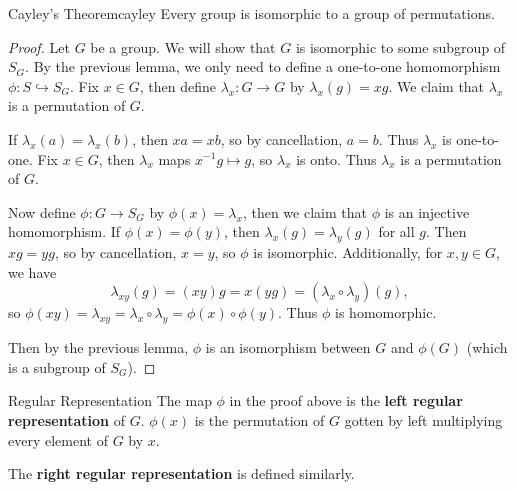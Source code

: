 \documentclass[10pt]{report}
\begin{document}
\begin{thrm}{Cayley's Theorem}{cayley}
Every group is isomorphic to a group of permutations.
\end{thrm}
\begin{proof}
	Let $G$ be a group. We will show that $G$ is isomorphic to some subgroup of $S_{G}$. By the previous lemma, we only need to define a one-to-one homomorphism $\phi:S\hookrightarrow S_G$. Fix $x \in G$, then define $\lambda_x:G\to G$ by $\lambda_x(g) =xg$. We claim that $\lambda_x$ is a permutation of $G$.

	If $\lambda_x(a)=\lambda_x(b)$, then $xa=xb$, so by cancellation, $a=b$. Thus $\lambda_x$ is one-to-one. Fix $x \in G$, then $\lambda_x$ maps $x^{-1}g \mapsto g$, so $\lambda_x$ is onto. Thus $\lambda_x$ is a permutation of $G$.

	Now define $\phi:G\to S_G$ by $\phi(x)=\lambda_x$, then we claim that $\phi$ is an injective homomorphism. If $\phi(x)=\phi(y)$, then $\lambda_x(g)=\lambda_y(g)$ for all $g$. Then $xg=yg$, so by cancellation, $x=y$, so $\phi$ is isomorphic. Additionally, for $x,y\in G$, we have
	\[
		\lambda_{xy}(g)=(xy)g=x(yg)=(\lambda_x \circ \lambda_y)(g),
	\] so $\phi(xy)=\lambda_{xy}=\lambda_x \circ \lambda_y = \phi(x)\circ\phi(y)$. Thus $\phi$ is homomorphic.

	Then by the previous lemma, $\phi$ is an isomorphism between $G$ and $\phi(G)$ (which is a subgroup of $S_G$).
\end{proof}

\begin{defn}{Regular Representation}{}
	The map $\phi$ in the proof above is the \textbf{left regular representation} of $G$. $\phi(x)$ is the permutation of $G$ gotten by left multiplying every element of $G$ by $x$.

	The \textbf{right regular representation} is defined similarly.
\end{defn}
\end{document}
